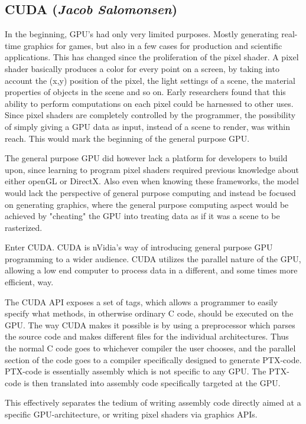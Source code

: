 \subsection{CUDA (\textit{Jacob Salomonsen})}
In the beginning, GPU's had only very limited purposes. Mostly generating real-time graphics for games, but also in a few cases for production and scientific applications. This has changed since the proliferation of the pixel shader. A pixel shader basically produces a color for every point on a screen, by taking into account the (x,y) position of the pixel, the light settings of a scene, the material properties of objects in the scene and so on. Early researchers found that this ability to perform computations on each pixel could be harnessed to other uses. Since pixel shaders are completely controlled by the programmer, the possibility of simply giving a GPU data as input, instead of a scene to render, was within reach. This would mark the beginning of the general purpose GPU.

The general purpose GPU did however lack a platform for developers to build upon, since learning to program pixel shaders required previous knowledge about either openGL or DirectX. Also even when knowing these frameworks, the model would lack the perspective of general purpose computing and instead be focused on generating graphics, where the general purpose computing aspect would be achieved by "cheating" the GPU into treating data as if it was a scene to be rasterized.

Enter CUDA. CUDA is nVidia's way of introducing general purpose GPU programming to a wider audience. CUDA utilizes the parallel nature of the GPU, allowing a low end computer to process data in a different, and some times more efficient, way.

The CUDA API exposes a set of tags, which allows a programmer to easily specify what methods, in otherwise ordinary C code, should be executed on the GPU. The way CUDA makes it possible is by using a preprocessor which parses the source code and makes different files for the individual architectures. Thus the normal C code goes to whichever compiler the user chooses, and the parallel section of the code goes to a compiler specifically designed to generate PTX-code. PTX-code is essentially assembly which is not specific to any GPU. The PTX-code is then translated into assembly code specifically targeted at the GPU.

This effectively separates the tedium of writing assembly code directly aimed at a specific GPU-architecture, or writing pixel shaders via graphics APIs.


